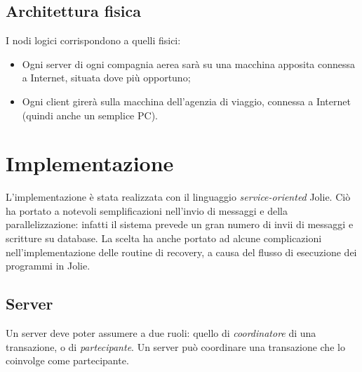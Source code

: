 \documentclass[a4paper]{article}
\begin{document}

\subsection{Architettura fisica}
I nodi logici corrispondono a quelli fisici:
\begin{itemize}
	\item Ogni server di ogni compagnia aerea sarà su una macchina apposita connessa a Internet, situata dove più opportuno;
	\item Ogni client girerà sulla macchina dell'agenzia di viaggio, connessa a Internet (quindi anche un semplice PC).
\end{itemize}


\section{Implementazione}

L'implementazione è stata realizzata con il linguaggio \textit{service-oriented} Jolie. Ciò ha portato a notevoli semplificazioni nell'invio di messaggi e della parallelizzazione: infatti il sistema prevede un gran numero di invii di messaggi e scritture su database. La scelta ha anche portato ad alcune complicazioni nell'implementazione delle routine di recovery, a causa del flusso di esecuzione dei programmi in Jolie.

\subsection{Server}
Un server deve poter assumere a due ruoli: quello di \textit{coordinatore} di una transazione, o di \textit{partecipante}. Un server può coordinare una transazione che lo coinvolge come partecipante.
\end{document}
